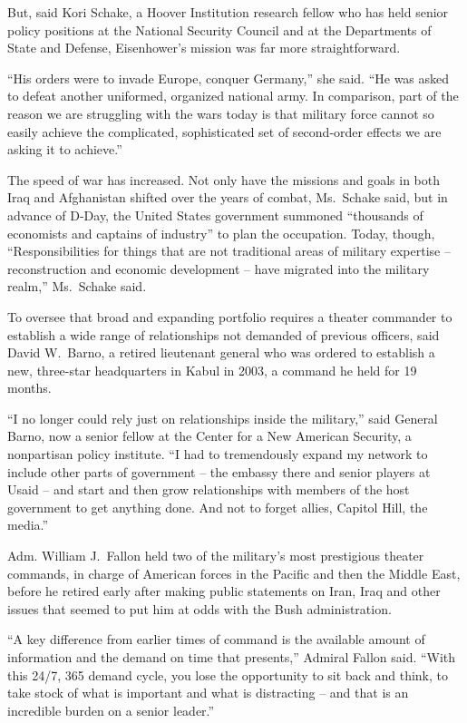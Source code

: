 ﻿\documentclass[12pt]{article}
\begin{document}
But, said Kori Schake, a Hoover Institution research fellow who has held senior policy positions at
the National Security Council and at the Departments of State and Defense, Eisenhower's mission was
far more straightforward.

``His orders were to invade Europe, conquer Germany,'' she said. ``He was asked to defeat another
uniformed, organized national army. In comparison, part of the reason we are struggling with the
wars today is that military force cannot so easily achieve the complicated, sophisticated set of
second-order effects we are asking it to achieve.''

The speed of war has increased. Not only have the missions and goals in both Iraq and Afghanistan
shifted over the years of combat, Ms.~Schake said, but in advance of D-Day, the United States
government summoned ``thousands of economists and captains of industry'' to plan the occupation.
Today, though, ``Responsibilities for things that are not traditional areas of military expertise --
reconstruction and economic development -- have migrated into the military realm,'' Ms.~Schake said.

To oversee that broad and expanding portfolio requires a theater commander to establish a wide range
of relationships not demanded of previous officers, said David W.~Barno, a retired lieutenant
general who was ordered to establish a new, three-star headquarters in Kabul in 2003, a command he
held for 19 months.

``I no longer could rely just on relationships inside the military,'' said General Barno, now a
senior fellow at the Center for a New American Security, a nonpartisan policy institute. ``I had to
tremendously expand my network to include other parts of government -- the embassy there and senior
players at Usaid -- and start and then grow relationships with members of the host government to get
anything done. And not to forget allies, Capitol Hill, the media.''

Adm. William J.~Fallon held two of the military's most prestigious theater commands, in charge of
American forces in the Pacific and then the Middle East, before he retired early after making public
statements on Iran, Iraq and other issues that seemed to put him at odds with the Bush
administration.

``A key difference from earlier times of command is the available amount of information and the
demand on time that presents,'' Admiral Fallon said. ``With this 24/7, 365 demand cycle, you lose
the opportunity to sit back and think, to take stock of what is important and what is distracting --
and that is an incredible burden on a senior leader.''
\end{document}
